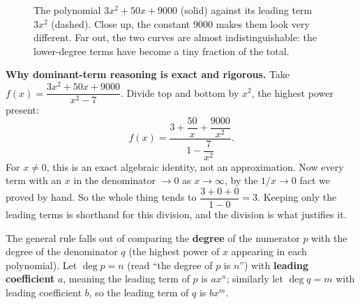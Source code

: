 \begin{figure}[htbp]
\centering
{}
\caption{The polynomial $3x^2+50x+9000$ (solid) against its leading term $3x^2$
(dashed). Close up, the constant $9000$ makes them look very different. Far
out, the two curves are almost indistinguishable: the lower-degree terms have
become a tiny fraction of the total.}
\label{ch09:fig-leading-term}
\end{figure}

\begin{whybox}
\textbf{Why dominant-term reasoning is exact and rigorous.} Take
$f(x)=\dfrac{3x^2+50x+9000}{x^2-7}$. Divide top and bottom by $x^2$, the highest
power present:
\[
  f(x) = \frac{3 + \dfrac{50}{x} + \dfrac{9000}{x^2}}
              {1 - \dfrac{7}{x^2}} .
\]
For $x\ne 0$, this is an exact algebraic identity, not an approximation. Now every
term with an $x$ in the denominator $\to 0$ as $x\to\infty$, by the
$1/x\to 0$ fact we proved by hand. So the whole thing tends to
$\dfrac{3+0+0}{1-0} = 3$. Keeping only the leading terms is shorthand for
this division, and the division is what justifies it.
\end{whybox}

The general rule falls out of comparing the \textbf{degree} of the numerator $p$
with the degree of the denominator $q$ (the highest power of $x$ appearing in
each polynomial). Let $\deg p = n$ (read ``the degree of $p$ is $n$'') with
\textbf{leading coefficient} $a$, meaning the leading term of $p$ is $ax^n$;
similarly let $\deg q = m$ with leading coefficient $b$, so the leading term of
$q$ is $bx^m$.


